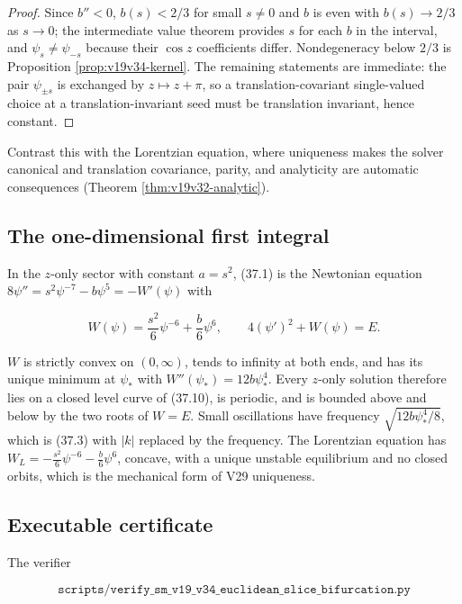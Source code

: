 \documentclass[11pt]{article}
\theoremstyle{remark}
\begin{document}
\begin{proof}
Since \(b''<0\), \(b(s)<2/3\) for small \(s\neq0\) and \(b\) is even
with \(b(s)\to2/3\) as \(s\to0\); the intermediate value theorem provides
\(s\) for each \(b\) in the interval, and \(\psi_s\neq\psi_{-s}\)
because their \(\cos z\) coefficients differ.  Nondegeneracy below
\(2/3\) is Proposition \ref{prop:v19v34-kernel}.  The remaining
statements are immediate: the pair \(\psi_{\pm s}\) is exchanged by
\(z\mapsto z+\pi\), so a translation-covariant single-valued choice at
a translation-invariant seed must be translation invariant, hence
constant.
\end{proof}

Contrast this with the Lorentzian equation, where uniqueness makes the
solver canonical and translation covariance, parity, and analyticity
are automatic consequences (Theorem \ref{thm:v19v32-analytic}).

\subsection{The one-dimensional first integral}

In the \(z\)-only sector with constant \(a=s^2\), (37.1) is the
Newtonian equation \(8\psi''=s^2\psi^{-7}-b\psi^5=-W'(\psi)\) with

\[
 W(\psi)=\frac{s^2}{6}\psi^{-6}+\frac b6\psi^{6},
 \qquad 4(\psi')^2+W(\psi)=E.                                      \tag{37.10}
\]

\(W\) is strictly convex on \((0,\infty)\), tends to infinity at both
ends, and has its unique minimum at \(\psi_*\) with
\(W''(\psi_*)=12b\psi_*^4\).  Every \(z\)-only solution therefore lies
on a closed level curve of (37.10), is periodic, and is bounded above and
below by the two roots of \(W=E\).  Small oscillations have frequency
\(\sqrt{12b\psi_*^4/8}\), which is (37.3) with \(|k|\) replaced by the
frequency.  The Lorentzian equation has \(W_L=-\tfrac{s^2}6\psi^{-6}-\tfrac b6\psi^6\),
concave, with a unique unstable equilibrium and no closed orbits, which
is the mechanical form of V29 uniqueness.

\subsection{Executable certificate}

The verifier

\[
 \texttt{scripts/verify\_sm\_v19\_v34\_euclidean\_slice\_bifurcation.py}
                                                                    \tag{37.11}
\]
\end{document}
